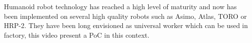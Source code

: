 Humanoid robot technology has reached a high level of maturity and now
has been implemented on several high quality robots such as Asimo,
Atlas, TORO or HRP-2. They have been long envisioned as universal worker
which can be used in factory, this video present a PoC in this context.


